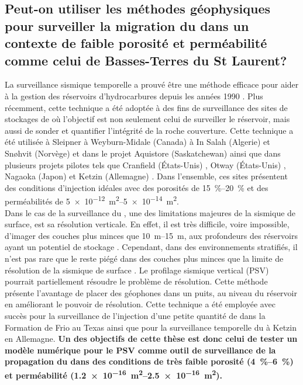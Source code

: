\subsection{Peut-on utiliser les méthodes géophysiques pour surveiller la
migration du \texorpdfstring{}{CO2} dans un contexte de faible
porosité et perméabilité comme celui de Basses-Terres du St Laurent?}
\label{sc:obj1}
La surveillance sismique temporelle a prouvé être une méthode
efficace pour aider à la gestion des réservoirs d'hydrocarbures depuis les
années 1990 \citep{Johnston2010}. Plus récemment, cette technique a été adoptée
à des fins de surveillance des sites de stockages de  où l'objectif est
non seulement celui de surveiller le réservoir, mais aussi de sonder et
quantifier l’intégrité de la roche couverture. Cette technique a été utilisée à
Sleipner \citep{Arts2004} à Weyburn-Midale (Canada) \citep{Li2001,Davis2003,White2013} à
In Salah (Algerie) et Sn{\o}hvit (Norvège) \citep{Eiken2011} et dans le projet Aquistore (Saskatchewan) \citep{Roach2015} ainsi
que dans plusieurs projets pilotes tels que Cranfield (États-Unis) \citep{Zhang2012}, Otway (États-Unis)
\citep{Urosevic2010}, Nagaoka (Japon) \citep{Sato2011} et Ketzin (Allemagne)
\citep{Luth2011,Ivanova2012}. Dans l'ensemble, ces sites présentent des
conditions d'injection idéales avec des porosités de \SIrange[range-units =
single]{15}{20}{\percent} et des perméabilités de \SIrange[range-units =
single]{5e-12}{5e-14}{\metre\squared}.  \\
Dans le cas de la surveillance du , une des limitations majeures de la
sismique de surface, est sa résolution verticale. En effet, il est très
difficile, voire impossible, d’imager des couches plus minces que
\SIrange{10}{15}{\metre}, aux profondeurs des réservoirs ayant un potentiel de
stockage \citep{Arts2004}. Cependant, dans des environnements stratifiés, il
n'est pas rare que le  reste piégé dans des couches plus minces que la
limite de résolution de la sismique de surface
\citep{Chadwick2004,Chadwick2005,Chadwick2009,Bickle2007,Lippard2008}. Le
profilage sismique vertical (PSV) pourrait partiellement résoudre le problème de
résolution. Cette méthode présente l'avantage de placer des géophones dans un
puits, au niveau du réservoir en améliorant le pouvoir de résolution. Cette
technique a été employée avec succès pour la surveillance de l'injection d'une
petite quantité de  dans la Formation de Frio au Texas \citep{Daley2008}
ainsi que pour la surveillance temporelle du  à Ketzin en Allemagne.
\textbf{Un des objectifs de cette thèse est donc celui de tester un modèle
numérique pour le PSV comme outil de surveillance de la propagation du 
dans des conditions de très faible porosité (\SIrange[range-units =
single]{4}{6}{\percent}) et perméabilité (\SIrange[range-units =
single]{1.2e-16}{2.5e-16}{\metre\squared}).}\par

